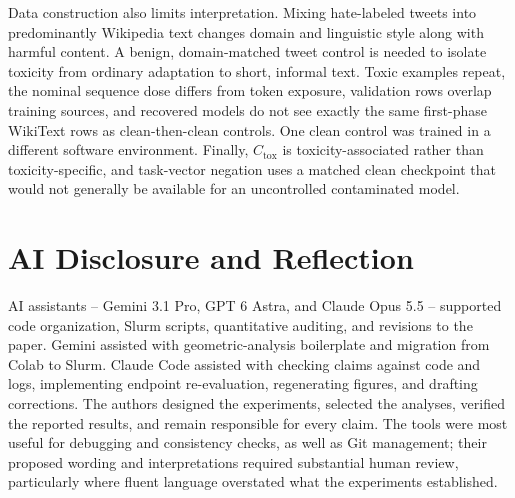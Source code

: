 Data construction also limits interpretation. Mixing hate-labeled tweets into predominantly Wikipedia text changes domain and linguistic style along with harmful content. A benign, domain-matched tweet control is needed to isolate toxicity from ordinary adaptation to short, informal text. Toxic examples repeat, the nominal sequence dose differs from token exposure, validation rows overlap training sources, and recovered models do not see exactly the same first-phase WikiText rows as clean-then-clean controls. One clean control was trained in a different software environment. Finally, $C_{\mathrm{tox}}$ is toxicity-associated rather than toxicity-specific, and task-vector negation uses a matched clean checkpoint that would not generally be available for an uncontrolled contaminated model.

\section*{AI Disclosure and Reflection}
AI assistants -- Gemini 3.1 Pro, GPT 6 Astra, and Claude Opus 5.5 -- supported code organization, Slurm scripts, quantitative auditing, and revisions to the paper. Gemini assisted with geometric-analysis boilerplate and migration from Colab to Slurm. Claude Code assisted with checking claims against code and logs, implementing endpoint re-evaluation, regenerating figures, and drafting corrections. The authors designed the experiments, selected the analyses, verified the reported results, and remain responsible for every claim. The tools were most useful for debugging and consistency checks, as well as Git management; their proposed wording and interpretations required substantial human review, particularly where fluent language overstated what the experiments established.
